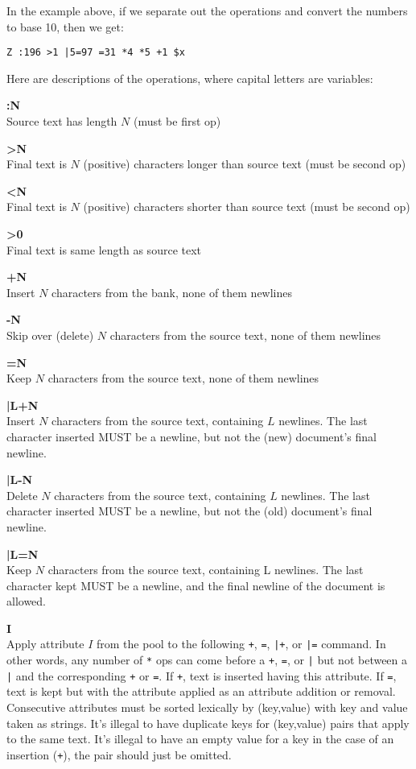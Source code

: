 \documentclass[12pt]{article}
\begin{document}
In the example above, if we separate out the operations
and convert the numbers to base 10, then we get:
\begin{verbatim}
Z :196 >1 |5=97 =31 *4 *5 +1 $x
\end{verbatim}
Here are descriptions of the operations, where capital
letters are variables:

\begin{description}
\item{{\bf :N}} \quad \\ 
Source text has length $N$ (must be first op)
\item{{\bf >N}} \quad \\
Final text is $N$ (positive) characters longer than source
text (must be second op)
\item{{\bf <N }} \quad \\
Final text is $N$ (positive) characters shorter than
source text (must be second op)
\item{{\bf >0 }} \quad \\
Final text is same length as source text
\item{{\bf +N }} \quad \\
Insert $N$ characters from the bank, none of them newlines
\item{{\bf -N}} \quad \\
Skip over (delete) $N$ characters from the source text,
none of them newlines
\item{{\bf =N}} \quad \\
Keep $N$ characters from the source text, none of them newlines
\item{{\bf |L+N}} \quad \\
Insert $N$ characters from the source text, containing $L$
newlines.  The last character inserted MUST be a newline,
but not the (new) document's final newline.
\item{{\bf |L-N}}  \quad \\
Delete $N$ characters from the source text, containing $L$
newlines. The last character inserted MUST be a newline,
but not the (old) document's final newline.
\item{{\bf |L=N}}  \quad \\
Keep $N$ characters from the source text, containing L
newlines.  The last character kept MUST be a newline, and
the final newline of the document is allowed.
\item{{\bf *I}} \quad \\
Apply attribute $I$ from the pool to the following
\verb|+|, \verb|=|, \verb_|+_, or \verb_|=_ command. In
other words, any number of \verb|*| ops can come before a
\verb_+_, \verb_=_, or \verb_|_ but not between a \verb_|_
and the corresponding \verb_+_ or \verb_=_. If \verb_+_,
text is inserted having this attribute.  If \verb_=_, text
is kept but with the attribute applied as an attribute
addition or removal. Consecutive attributes must be sorted
lexically by (key,value) with key and value taken as
strings.  It's illegal to have duplicate keys for
(key,value) pairs that apply to the same text.  It's
illegal to have an empty value for a key in the case of an
insertion (\verb_+_), the pair should just be omitted.
\end{description}
\end{document}
